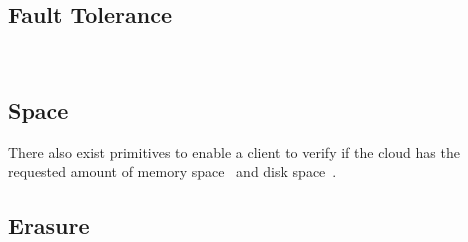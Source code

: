 ~\cite{WSJ+12,WSJ+13,WSJ+14}

\subsection{Fault Tolerance}

~\cite{BDJ+11}

\subsection{Space}

There also exist primitives to enable a client to verify if the cloud has the requested amount of memory space~\cite{ABF13} and disk space~\cite{DFK+13}.

\subsection{Erasure}

~\cite{PT10}


